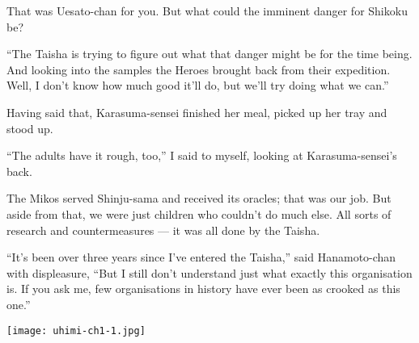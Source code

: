 That was Uesato-chan for you. But what could the imminent danger for Shikoku be?

``The Taisha is trying to figure out what that danger might be for the time being. And looking into the samples the Heroes brought back from their expedition. Well, I don't know how much good it'll do, but we'll try doing what we can.''

Having said that, Karasuma-sensei finished her meal, picked up her tray and stood up.

``The adults have it rough, too,'' I said to myself, looking at Karasuma-sensei's back.

The Mikos served Shinju-sama and received its oracles; that was our job. But aside from that, we were just children who couldn't do much else. All sorts of research and countermeasures --- it was all done by the Taisha.

``It's been over three years since I've entered the Taisha,'' said Hanamoto-chan with displeasure, ``But I still don't understand just what exactly this organisation is. If you ask me, few organisations in history have ever been as crooked as this one.''

\newpage
\thispagestyle{empty}
\texttt{[image: uhimi-ch1-1.jpg]}

